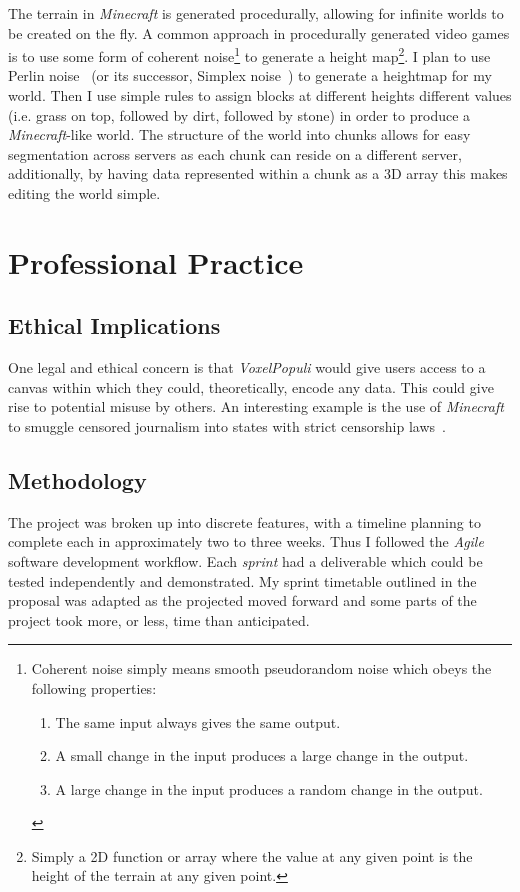 \documentclass[12pt,notitlepage,a4paper]{report}
\newcommand{\voxpop}{\emph{VoxelPopuli}}
\begin{document}
	The terrain in \emph{Minecraft} is generated procedurally, allowing for infinite worlds to be created on the fly. A common approach in procedurally generated video games is to use some form of coherent noise\footnote{Coherent noise simply means smooth pseudorandom noise which obeys the following properties: \begin{enumerate} \item The same input always gives the same output. \item A small change in the input produces a large change in the output. \item A large change in the input produces a random change in the output.\end{enumerate}} to generate a height map\footnote{Simply a 2D function or array where the value at any given point is the height of the terrain at any given point.}. I plan to use Perlin noise~\cite{perlin} (or its successor, Simplex noise~\cite{simplex}) to generate a heightmap for my world. Then I use simple rules to assign blocks at different heights different values (i.e. grass on top, followed by dirt, followed by stone) in order to produce a \emph{Minecraft}-like world. The structure of the world into chunks allows for easy segmentation across servers as each chunk can reside on a different server, additionally, by having data represented within a chunk as a 3D array this makes editing the world simple.
	
	\section{Professional Practice}
	\subsection{Ethical Implications} %
	One legal and ethical concern is that \voxpop{} would give users access to a canvas within which they could, theoretically, encode any data. This could give rise to potential misuse by others. An interesting example is the use of \emph{Minecraft} to smuggle censored journalism into states with strict censorship laws~\cite{verge}.
	
	\subsection{Methodology}
	The project was broken up into discrete features, with a timeline planning to complete each in approximately two to three weeks. Thus I followed the \emph{Agile} software development workflow. Each \emph{sprint} had a deliverable which could be tested independently and demonstrated. My sprint timetable outlined in the proposal was adapted as the projected moved forward and some parts of the project took more, or less, time than anticipated.
	
\end{document}
